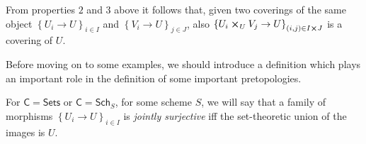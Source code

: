 \documentclass[../Main]{subfiles}
\begin{document}
\begin{rem}[]
	From properties $2$ and $3$ above it follows that, given 
	two coverings of the same object $\left\{ U_{ i } \to U \right\}_{ i \in I }$
	and $\left\{ V_{ i } \to U \right\}_{ j \in J }$, also
	$\left\{ U_{ i } \cross_U V_j \to U \right\}_{ (i,j) \in I \cross J }$
	is a covering of $U$.
\end{rem}


\noindent
Before moving on to some examples, we should introduce a
definition which plays an important role in the definition of
some important pretopologies.
\begin{defn}
	For $\mathsf{C} = \mathsf{Sets}$ or $\mathsf{C} = \mathsf{Sch}_{ S }$, for some scheme $S$,
	we will say that a family of morphisms
	$\left\{ U_{ i } \to U \right\}_{ i \in I }$ is {\em jointly surjective} iff
	the set-theoretic union of the images is $U$.
\end{defn}
\end{document}
